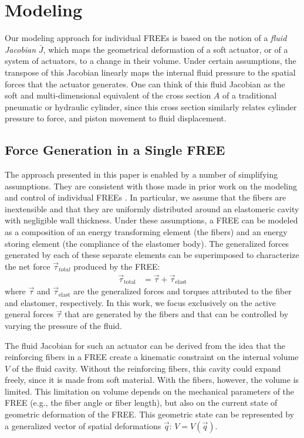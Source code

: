 \section{Modeling}
\label{sec:singleActuator}
%
Our modeling approach for individual FREEs is based on the notion of a \emph{fluid Jacobian} $\bar{J}$, which maps the geometrical deformation of a soft actuator, or of a system of actuators, to a change in their volume. 
Under certain assumptions, the transpose of this Jacobian linearly maps the internal fluid pressure to the spatial forces that the actuator generates. 
One can  think of this fluid Jacobian as the soft and multi-dimensional equivalent of the cross section $A$ of a traditional pneumatic or hydraulic cylinder,
since this cross section similarly relates cylinder pressure to force, and piston movement to fluid displacement.


\subsection{Force Generation in a Single FREE}
%
The approach presented in this paper is enabled by a number of simplifying assumptions.
They are consistent with those made in prior work on the modeling and control of individual FREEs \cite{bishop2015design,bruder2017model}.
In particular, we assume that the fibers are inextensible and that they are uniformly  distributed  around  an elastomeric cavity  with negligible  wall thickness.
Under these assumptions, a FREE can be modeled as a composition of an energy transforming element (the fibers) and an energy storing element (the compliance of the elastomer body). 
The generalized forces generated by each of these separate elements can be superimposed to characterize the net force $\vec{\tau}_{total}$ produced by the FREE:
\begin{align}
   \vec{\tau}_{\text{total}} &=  \vec{\tau} + \vec{\tau}_{\text{elast}}    \label{eq:netF}
\end{align}
where $\vec{\tau}$ and $\vec{\tau}_{\text{elast}}$ are the generalized forces and torques attributed to the fiber and elastomer, respectively.
In this work, we focus exclusively on the active general forces $\vec{\tau}$ that are generated by the fibers and that can be controlled by varying the pressure of the fluid.


The fluid Jacobian for such an actuator can be derived from the idea that the reinforcing fibers in a FREE create a kinematic constraint on the internal volume $V$ of the fluid cavity.
Without the reinforcing fibers, this cavity could expand freely, since it is made from soft material.
With the fibers, however, the volume is limited.
This limitation on volume depends on the mechanical parameters of the FREE (e.g., the fiber angle or fiber length), but also on the current state of geometric deformation of the FREE.
This geometric state can be represented by a generalized vector of spatial deformations $\vec{q}$:  $V = V\left(\vec{q}\right)$.


